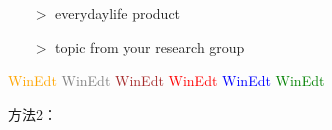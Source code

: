 

\usepackage{bbding}%
\newcommand{\handr}{\textcolor{magenta}{\HandRight}} %

\iffalse
\begin{itemize}
          \item[\(>\)] everydaylife product
          \item[\(>\)] topic from your research group
\end{itemize}

\textcolor{orange}{WinEdt}
\textcolor{gray}{WinEdt}
\textcolor{brown}{WinEdt}
\textcolor{red}{WinEdt}
\textcolor{blue}{WinEdt}
\textcolor{green}{WinEdt}





\begin{frame}

\end{frame}

方法2：

